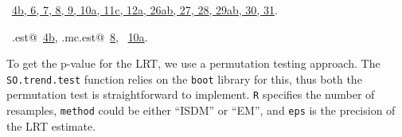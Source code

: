 \documentclass[reqno]{amsart}
\renewcommand{\NWlink}[2]{\hyperlink{#1}{#2}}
\begin{document}
\begin{flushleft}
\begin{list}{}{\setlength{\itemsep}{-\parsep}\setlength{\itemindent}{-\leftmargin}}
\item \NWtxtFileDefBy\ \NWlink{nuweb4b}{4b}\NWlink{nuweb6}{, 6}\NWlink{nuweb7}{, 7}\NWlink{nuweb8}{, 8}\NWlink{nuweb9}{, 9}\NWlink{nuweb10a}{, 10a}\NWlink{nuweb11c}{, 11c}\NWlink{nuweb12a}{, 12a}\NWlink{nuweb26a}{, 26a}\NWlink{nuweb26b}{b}\NWlink{nuweb27}{, 27}\NWlink{nuweb28}{, 28}\NWlink{nuweb29a}{, 29a}\NWlink{nuweb29b}{b}\NWlink{nuweb30}{, 30}\NWlink{nuweb31}{, 31}.
\item \NWtxtIdentsUsed\nobreak\  \verb@mc.est@\nobreak\ \NWlink{nuweb4b}{4b}, \verb@SO.mc.est@\nobreak\ \NWlink{nuweb8}{8}, \verb@soControl@\nobreak\ \NWlink{nuweb10a}{10a}.
\item{}
\end{list}
\vspace{4ex}
\end{flushleft}
To get the p-value for the LRT, we use a permutation testing approach. The \texttt{SO.trend.test} function
relies on the \texttt{boot} library for this, thus both the permutation test
is straightforward to implement. \texttt{R}
specifies the number of resamples, \texttt{method} could be either ``ISDM'' or 
``EM'', and \texttt{eps} is the precision of the LRT estimate.
\end{document}
